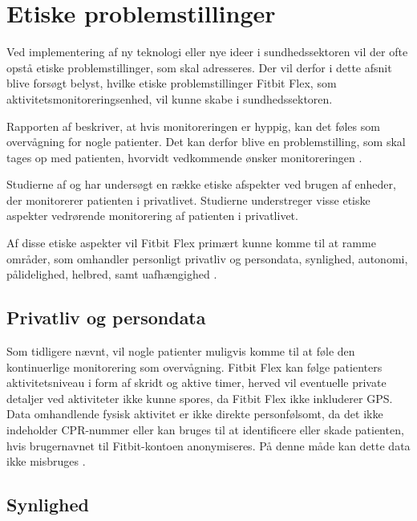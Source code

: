 \section{Etiske problemstillinger}

Ved implementering af ny teknologi eller nye ideer i sundhedssektoren vil der ofte opstå etiske problemstillinger, som skal adresseres. Der vil derfor i dette afsnit blive forsøgt belyst, hvilke etiske problemstillinger Fitbit Flex, som aktivitetsmonitoreringsenhed, vil kunne skabe i sundhedssektoren.

Rapporten af \citeauthor{patienthome2015} beskriver, at hvis monitoreringen er hyppig, kan det føles som overvågning for nogle patienter. Det kan derfor blive en problemstilling, som skal tages op med patienten, hvorvidt vedkommende ønsker monitoreringen \citep{patienthome2015, SundhedsstyrelsenPatientersRetsstilling2016}.

Studierne af \citeauthor{Mittelstand2011} og \citeauthor{Nordgren2013} har undersøgt en række etiske afspekter ved brugen af enheder, der monitorerer patienten i privatlivet. Studierne understreger visse etiske aspekter vedrørende monitorering af patienten i privatlivet.

Af disse etiske aspekter vil Fitbit Flex primært kunne komme til at ramme områder, som omhandler personligt privatliv og persondata, synlighed, autonomi, pålidelighed, helbred, samt uafhængighed \citep{Mittelstand2011, Nordgren2013}.


\subsection{Privatliv og persondata}

Som tidligere nævnt, vil nogle patienter muligvis komme til at føle den kontinuerlige monitorering som overvågning. Fitbit Flex kan følge patienters aktivitetsniveau i form af skridt og aktive timer, herved vil eventuelle private detaljer ved aktiviteter ikke kunne spores, da Fitbit Flex ikke inkluderer GPS.
Data omhandlende fysisk aktivitet er ikke direkte personfølsomt, da det ikke indeholder CPR-nummer eller kan bruges til at identificere eller skade patienten, hvis brugernavnet til Fitbit-kontoen anonymiseres. På denne måde kan dette data ikke misbruges \citep{Mittelstand2011}.


\subsection{Synlighed}

